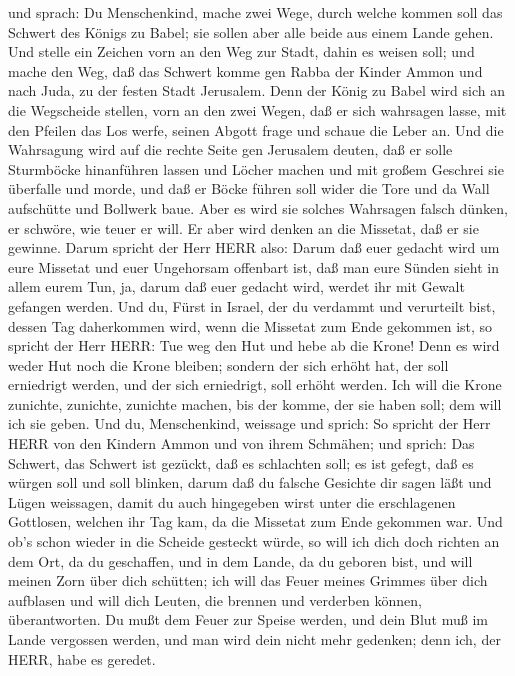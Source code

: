 und sprach:  Du Menschenkind, mache zwei Wege, durch welche
kommen soll das Schwert des Königs zu Babel; sie sollen aber alle beide
aus einem Lande gehen.  Und stelle ein Zeichen vorn an den
Weg zur Stadt, dahin es weisen soll; und mache den Weg, daß das Schwert
komme gen Rabba der Kinder Ammon und nach Juda, zu der festen Stadt
Jerusalem.  Denn der König zu Babel wird sich an die
Wegscheide stellen, vorn an den zwei Wegen, daß er sich wahrsagen lasse,
mit den Pfeilen das Los werfe, seinen Abgott frage und schaue die Leber
an.  Und die Wahrsagung wird auf die rechte Seite gen
Jerusalem deuten, daß er solle Sturmböcke hinanführen lassen und Löcher
machen und mit großem Geschrei sie überfalle und morde, und daß er Böcke
führen soll wider die Tore und da Wall aufschütte und Bollwerk baue.
 Aber es wird sie solches Wahrsagen falsch dünken, er
schwöre, wie teuer er will. Er aber wird denken an die Missetat, daß er
sie gewinne.  Darum spricht der Herr HERR also: Darum daß
euer gedacht wird um eure Missetat und euer Ungehorsam offenbart ist,
daß man eure Sünden sieht in allem eurem Tun, ja, darum daß euer gedacht
wird, werdet ihr mit Gewalt gefangen werden.  Und du, Fürst
in Israel, der du verdammt und verurteilt bist, dessen Tag daherkommen
wird, wenn die Missetat zum Ende gekommen ist,  so spricht
der Herr HERR: Tue weg den Hut und hebe ab die Krone! Denn es wird weder
Hut noch die Krone bleiben; sondern der sich erhöht hat, der soll
erniedrigt werden, und der sich erniedrigt, soll erhöht werden.
 Ich will die Krone zunichte, zunichte, zunichte machen,
bis der komme, der sie haben soll; dem will ich sie geben. 
Und du, Menschenkind, weissage und sprich: So spricht der Herr HERR von
den Kindern Ammon und von ihrem Schmähen; und sprich: Das Schwert, das
Schwert ist gezückt, daß es schlachten soll; es ist gefegt, daß es
würgen soll und soll blinken,  darum daß du falsche
Gesichte dir sagen läßt und Lügen weissagen, damit du auch hingegeben
wirst unter die erschlagenen Gottlosen, welchen ihr Tag kam, da die
Missetat zum Ende gekommen war.  Und ob's schon wieder in
die Scheide gesteckt würde, so will ich dich doch richten an dem Ort, da
du geschaffen, und in dem Lande, da du geboren bist,  und
will meinen Zorn über dich schütten; ich will das Feuer meines Grimmes
über dich aufblasen und will dich Leuten, die brennen und verderben
können, überantworten.  Du mußt dem Feuer zur Speise
werden, und dein Blut muß im Lande vergossen werden, und man wird dein
nicht mehr gedenken; denn ich, der HERR, habe es geredet.

